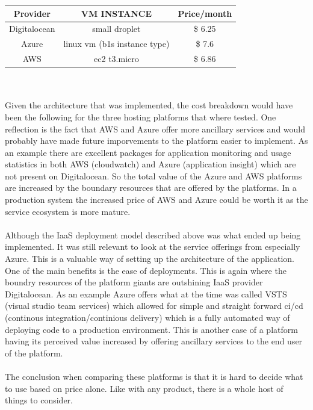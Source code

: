 \documentclass[]{uiophd}
\begin{document}
\begin{center}
 \begin{tabular}{||c | c | c ||} 
 \hline
 Provider & VM INSTANCE & Price/month \\ [0.5ex] 
 \hline\hline
 Digitalocean & small droplet & \$ 6.25 \\ 
 \hline
 Azure & linux vm (b1s instance type) &\$ 7.6 \\
 \hline
 AWS & ec2 t3.micro &\$ 6.86 \\
 \hline
\end{tabular}
\end{center}
\\\\
Given the architecture that was implemented, the cost breakdown would have been the following for the three hosting platforms that where tested. One reflection is the fact that AWS and Azure offer more ancillary services and would probably have made future imporvements to the platform easier to implement. As an example there are excellent packages for application monitoring and usage statistics in both AWS (cloudwatch) and Azure (application insight) which are not present on Digitalocean. So the total value of the Azure and AWS platforms are increased by the boundary resources that are offered by the platforms. In a production system the increased price of AWS and Azure could be worth it as the service ecosystem is more mature. 
\\\\
Although the IaaS deployment model described above was what ended up being implemented. It was still relevant to look at the service offerings from especially Azure. This is a valuable way of setting up the architecture of the application. One of the main benefits is the ease of deployments. This is again where the boundry resources of the platform giants are outshining IaaS provider Digitalocean. As an example Azure offers what at the time was called VSTS (visual studio team services) which allowed for simple and straight forward ci/cd (continous integration/continious delivery) which is a fully automated way of deploying code to a production environment. This is another case of a platform having its perceived value increased by offering ancillary services to the end user of the platform. 
\\\\
The conclusion when comparing these platforms is that it is hard to decide what to use based on price alone. Like with any product, there is a whole host of things to consider.
\end{document}
